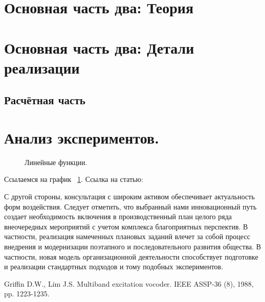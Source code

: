 \documentclass[a4paper,article,14pt]{extarticle}
\begin{document}
\pagebreak
\section{Основная часть два: Теория}

\section{Основная часть два: Детали реализации}
\subsection{Расчётная часть}

\section{Анализ экспериментов.}
\begin{figure}[ht]
\begin{center}

\caption{
\label{graph-fig}
     Линейные функции.}
\end {center}
\end {figure}
Ссылаемся на график ~\ref{graph-fig}.
Ссылка на статью: \cite{voc}


\pagebreak


С другой стороны, консультация с широким активом обеспечивает актуальность форм воздействия. Следует отметить, что выбранный нами инновационный путь создает необходимость включения в производственный план целого ряда внеочередных мероприятий с учетом комплекса благоприятных перспектив. В частности, реализация намеченных плановых заданий влечет за собой процесс внедрения и модернизации поэтапного и последовательного развития общества. В частности, новая модель организационной деятельности способствует подготовке и реализации стандартных подходов и тому подобных экспериментов.


\begin{thebibliography}{}
 Griffin D.W., Lim J.S. \flqq Multiband excitation vocoder\frqq. IEEE ASSP-36 (8), 1988, pp. 1223-1235.
\end{thebibliography}
\end{document}
